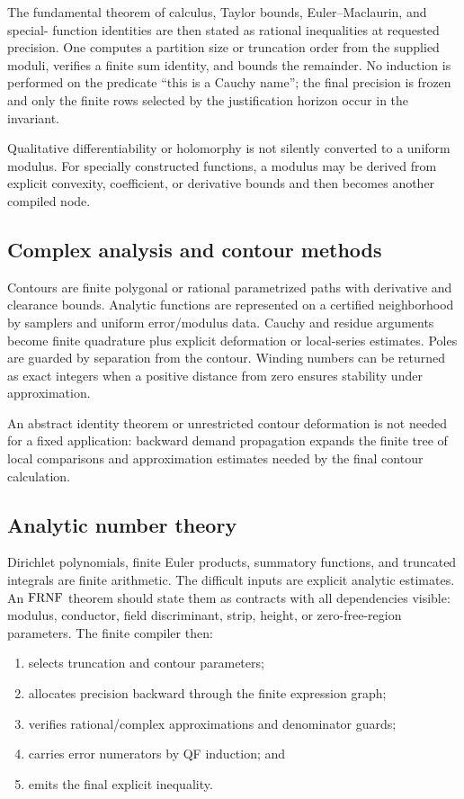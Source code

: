 The fundamental theorem of calculus, Taylor bounds, Euler--Maclaurin, and special-
function identities are then stated as rational inequalities at requested precision.
One computes a partition size or truncation order from the supplied moduli, verifies a
finite sum identity, and bounds the remainder.  No induction is performed on the
predicate ``this is a Cauchy name''; the final precision is frozen and only the finite
rows selected by the justification horizon occur in the invariant.

Qualitative differentiability or holomorphy is not silently converted to a uniform
modulus.  For specially constructed functions, a modulus may be derived from explicit
convexity, coefficient, or derivative bounds and then becomes another compiled node.

\subsection{Complex analysis and contour methods}

Contours are finite polygonal or rational parametrized paths with derivative and
clearance bounds.  Analytic functions are represented on a certified neighborhood by
samplers and uniform error/modulus data.  Cauchy and residue arguments become finite
quadrature plus explicit deformation or local-series estimates.  Poles are guarded by
separation from the contour.  Winding numbers can be returned as exact integers when a
positive distance from zero ensures stability under approximation.

An abstract identity theorem or unrestricted contour deformation is not needed for a
fixed application: backward demand propagation expands the finite tree of local
comparisons and approximation estimates needed by the final contour calculation.

\subsection{Analytic number theory}

Dirichlet polynomials, finite Euler products, summatory functions, and truncated
integrals are finite arithmetic.  The difficult inputs are explicit analytic estimates.
An \(\mathrm{FRNF}\) theorem should state them as contracts with all dependencies visible:
modulus, conductor, field discriminant, strip, height, or zero-free-region parameters.
The finite compiler then:

\begin{enumerate}[label=(\roman*),leftmargin=2.4em]
\item selects truncation and contour parameters;
\item allocates precision backward through the finite expression graph;
\item verifies rational/complex approximations and denominator guards;
\item carries error numerators by QF induction; and
\item emits the final explicit inequality.
\end{enumerate}

